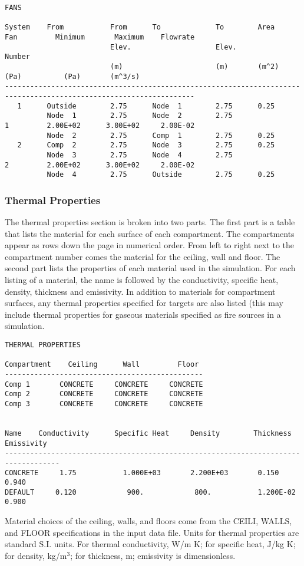 \begin{lstlisting}[basicstyle=\tiny]
FANS

System    From           From      To             To        Area      Fan         Minimum       Maximum    Flowrate
                         Elev.                    Elev.               Number
                         (m)                      (m)       (m^2)                 (Pa)          (Pa)       (m^3/s)
-------------------------------------------------------------------------------------------------------------------
   1      Outside        2.75      Node  1        2.75      0.25
          Node  1        2.75      Node  2        2.75                  1         2.00E+02      3.00E+02     2.00E-02
          Node  2        2.75      Comp  1        2.75      0.25
   2      Comp  2        2.75      Node  3        2.75      0.25
          Node  3        2.75      Node  4        2.75                  2         2.00E+02      3.00E+02     2.00E-02
          Node  4        2.75      Outside        2.75      0.25
\end{lstlisting}

\subsubsection{Thermal Properties}

The thermal properties section is broken into two parts.  The first part is a table that lists the material for each surface of each compartment.  The compartments appear as rows down the page in numerical order.  From left to right next to the compartment number comes the material for the ceiling, wall and floor.  The second part lists the properties of each material used in the simulation. For each listing of a material, the name is followed by the conductivity, specific heat, density, thickness and emissivity. In addition to materials for compartment surfaces, any thermal properties specified for targets are also listed (this may include thermal properties for gaseous materials specified as fire sources in a simulation.

\begin{lstlisting}[basicstyle=\tiny]
THERMAL PROPERTIES

Compartment    Ceiling      Wall         Floor
-----------------------------------------------
Comp 1       CONCRETE     CONCRETE     CONCRETE
Comp 2       CONCRETE     CONCRETE     CONCRETE
Comp 3       CONCRETE     CONCRETE     CONCRETE


Name    Conductivity      Specific Heat     Density        Thickness     Emissivity
-----------------------------------------------------------------------------------
CONCRETE     1.75           1.000E+03       2.200E+03       0.150           0.940
DEFAULT     0.120            900.            800.           1.200E-02       0.900
\end{lstlisting}
Material choices of the ceiling, walls, and floors come from the CEILI, WALLS, and FLOOR specifications in the input data file. Units for thermal properties are standard S.I. units.  For thermal conductivity, W/m K; for specific heat, J/kg K; for density, kg/m$^3$; for thickness, m; emissivity is dimensionless.


